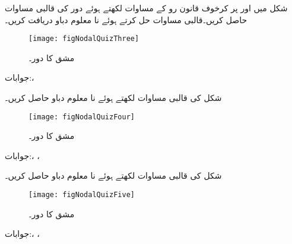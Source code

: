 \FloatBarrier
شکل  میں  اور  پر کرخوف قانون رو کے مساوات لکھتے ہوئے دور کی قالبی مساوات حاصل کریں۔قالبی مساوات حل کرتے ہوئے نا معلوم دباو دریافت کریں۔
\begin{figure}[!h]
\centering
\texttt{[image: figNodalQuizThree]}
\caption{مشق  کا دور۔}
\label{شکل_جوڑ_تیسرا_الف}
\end{figure}%

جوابات:، 

شکل  کی قالبی مساوات لکھتے ہوئے نا معلوم دباو حاصل کریں۔
\begin{figure}[!h]
\centering
\texttt{[image: figNodalQuizFour]}
\caption{مشق  کا دور۔}
\label{شکل_جوڑ_تیسرا_ب}
\end{figure}%

جوابات:، ،

شکل  کی قالبی مساوات لکھتے ہوئے نا معلوم دباو حاصل کریں۔
\begin{figure}[!h]
\centering
\texttt{[image: figNodalQuizFive]}
\caption{مشق  کا دور۔}
\label{شکل_جوڑ_تیسرا_پ}
\end{figure}%

جوابات:، ،
\FloatBarrier

